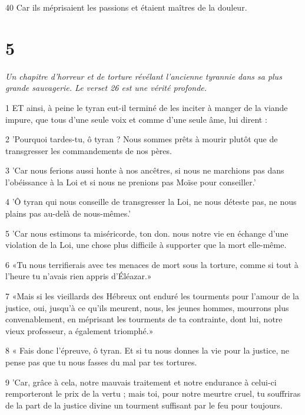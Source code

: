 \par 40 Car ils méprisaient les passions et étaient maîtres de la douleur.

\chapter{5}

\par \textit{Un chapitre d'horreur et de torture révélant l'ancienne tyrannie dans sa plus grande sauvagerie. Le verset 26 est une vérité profonde.}

\par 1 ET ainsi, à peine le tyran eut-il terminé de les inciter à manger de la viande impure, que tous d'une seule voix et comme d'une seule âme, lui dirent :

\par 2 'Pourquoi tardes-tu, ô tyran ? Nous sommes prêts à mourir plutôt que de transgresser les commandements de nos pères.

\par 3 'Car nous ferions aussi honte à nos ancêtres, si nous ne marchions pas dans l'obéissance à la Loi et si nous ne prenions pas Moïse pour conseiller.'

\par 4 'Ô tyran qui nous conseille de transgresser la Loi, ne nous déteste pas, ne nous plains pas au-delà de nous-mêmes.'

\par 5 'Car nous estimons ta miséricorde, ton don. nous notre vie en échange d'une violation de la Loi, une chose plus difficile à supporter que la mort elle-même.

\par 6 «Tu nous terrifierais avec tes menaces de mort sous la torture, comme si tout à l'heure tu n'avais rien appris d'Éléazar.»

\par 7 «Mais si les vieillards des Hébreux ont enduré les tourments pour l'amour de la justice, oui, jusqu'à ce qu'ils meurent, nous, les jeunes hommes, mourrons plus convenablement, en méprisant les tourments de ta contrainte, dont lui, notre vieux professeur, a également triomphé.»

\par 8 « Fais donc l'épreuve, ô tyran. Et si tu nous donnes la vie pour la justice, ne pense pas que tu nous fasses du mal par tes tortures.

\par 9 'Car, grâce à cela, notre mauvais traitement et notre endurance à celui-ci remporteront le prix de la vertu ; mais toi, pour notre meurtre cruel, tu souffriras de la part de la justice divine un tourment suffisant par le feu pour toujours.

